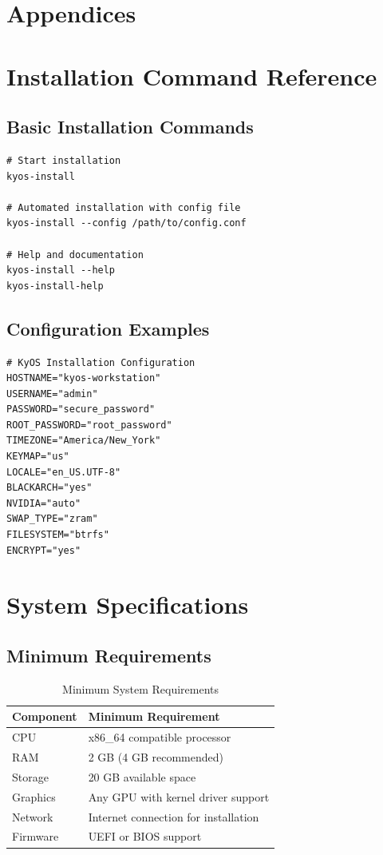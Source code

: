 \documentclass[12pt,a4paper]{article}
\begin{document}
\newpage

\section*{Appendices}

\appendix

\section{Installation Command Reference}

\subsection{Basic Installation Commands}
\begin{lstlisting}[caption=KyOS Installation Commands]
# Start installation
kyos-install

# Automated installation with config file
kyos-install --config /path/to/config.conf

# Help and documentation
kyos-install --help
kyos-install-help
\end{lstlisting}

\subsection{Configuration Examples}
\begin{lstlisting}[caption=Sample Configuration File]
# KyOS Installation Configuration
HOSTNAME="kyos-workstation"
USERNAME="admin"
PASSWORD="secure_password"
ROOT_PASSWORD="root_password"
TIMEZONE="America/New_York"
KEYMAP="us"
LOCALE="en_US.UTF-8"
BLACKARCH="yes"
NVIDIA="auto"
SWAP_TYPE="zram"
FILESYSTEM="btrfs"
ENCRYPT="yes"
\end{lstlisting}

\section{System Specifications}

\subsection{Minimum Requirements}
\begin{table}[H]
\centering
\begin{tabular}{@{}ll@{}}
\toprule
\textbf{Component} & \textbf{Minimum Requirement} \\
\midrule
CPU & x86\_64 compatible processor \\
RAM & 2 GB (4 GB recommended) \\
Storage & 20 GB available space \\
Graphics & Any GPU with kernel driver support \\
Network & Internet connection for installation \\
Firmware & UEFI or BIOS support \\
\bottomrule
\end{tabular}
\caption{Minimum System Requirements}
\end{table}
\end{document}
